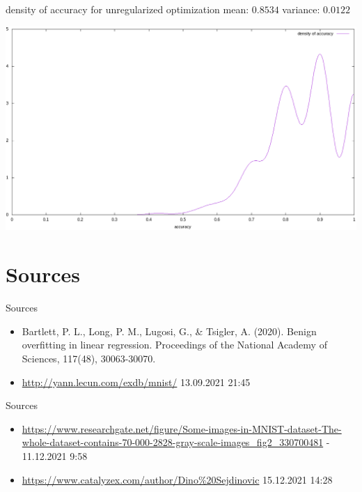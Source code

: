 \documentclass{beamer}
\begin{document}
\begin{frame}{density of accuracy for unregularized optimization}
mean: \(0.8534\) \hfill variance: \(0.0122\)
\begin{center}
	\includegraphics[width=\textwidth]{source/density_unregularized.png}
\end{center}
\end{frame}


\section{Sources}
\begin{frame}{Sources}
\tiny
\begin{itemize}
	\item Bartlett, P. L., Long, P. M., Lugosi, G., \& Tsigler, A. (2020). Benign overfitting in linear regression. Proceedings of the National Academy of Sciences, 117(48), 30063-30070.
	\item \url{http://yann.lecun.com/exdb/mnist/} 13.09.2021 21:45
\end{itemize}
\end{frame}

\begin{frame}{Sources}
\tiny
\begin{itemize}
	\item \url{https://www.researchgate.net/figure/Some-images-in-MNIST-dataset-The-whole-dataset-contains-70-000-2828-gray-scale-images_fig2_330700481} - 11.12.2021 9:58
	\item \url{https://www.catalyzex.com/author/Dino\%20Sejdinovic} 15.12.2021 14:28
\end{itemize}
\end{frame}
\end{document}

